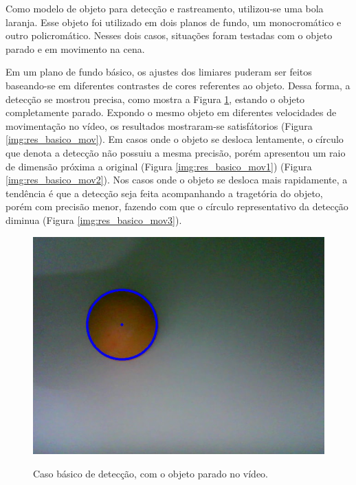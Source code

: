 Como modelo de objeto para detecção e rastreamento, utilizou-se uma bola laranja. Esse objeto foi utilizado em dois planos de fundo, um monocromático e outro policromático. Nesses dois casos, situações foram testadas com o objeto parado e em movimento na cena.

Em um plano de fundo básico, os ajustes dos limiares puderam ser feitos baseando-se em diferentes contrastes de cores referentes ao objeto. Dessa forma, a detecção se mostrou precisa, como mostra a Figura \ref{img:res_basico_parado}, estando o objeto completamente parado. Expondo o mesmo objeto em diferentes velocidades de movimentação no vídeo, os resultados mostraram-se satisfátorios (Figura \ref{img:res_basico_mov}). Em casos onde o objeto se desloca lentamente, o círculo que denota a detecção não possuiu a mesma precisão, porém apresentou um raio de dimensão próxima a original (Figura \ref{img:res_basico_mov1}) (Figura \ref{img:res_basico_mov2}). Nos casos onde o objeto se desloca mais rapidamente, a tendência é que a detecção seja feita acompanhando a tragetória do objeto, porém com precisão menor, fazendo com que o círculo representativo da detecção diminua (Figura \ref{img:res_basico_mov3}).

\begin{figure}[H]
    \centering
    {\includegraphics[scale=0.25]{figuras/res_basico1}}
    \caption{Caso básico de detecção, com o objeto parado no vídeo.}
    \label{img:res_basico_parado}
\end{figure}

